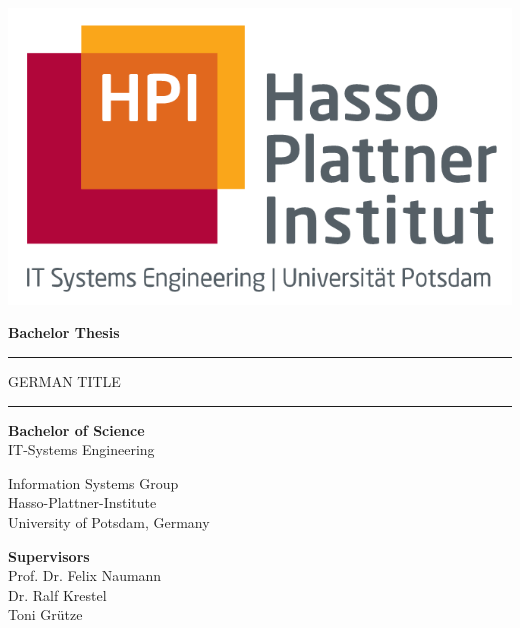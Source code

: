 \begin{titlepage}
  \begin{center}

    \includegraphics[scale=.3]{images/HPI.png}

    \vspace{1cm}

    {\Large\bfseries Bachelor Thesis \par}

    \vspace{0.5cm}

    \rule{\textwidth}{0.4pt}
    {\LARGE\bfseries \thetitle \par}
    \vspace{0.5cm}

    {\large\bfseries{GERMAN TITLE \par}}
    \rule{\textwidth}{0.4pt}


    \vspace{0.8cm}

    \Large{\theauthor}

    \vspace{0.8cm}

    {\large\bfseries{Bachelor of Science}}\\
    IT-Systems Engineering
    \vspace{0.3cm}

    Information Systems Group\\
    Hasso-Plattner-Institute\\
    University of Potsdam, Germany

    \vspace{0.8cm}

    \textbf{Supervisors}\\
    Prof. Dr. Felix Naumann\\
    Dr. Ralf Krestel\\
    Toni Grütze


    \vspace{0.8cm}

    \usvardate{}
  \end{center}
\end{titlepage}
